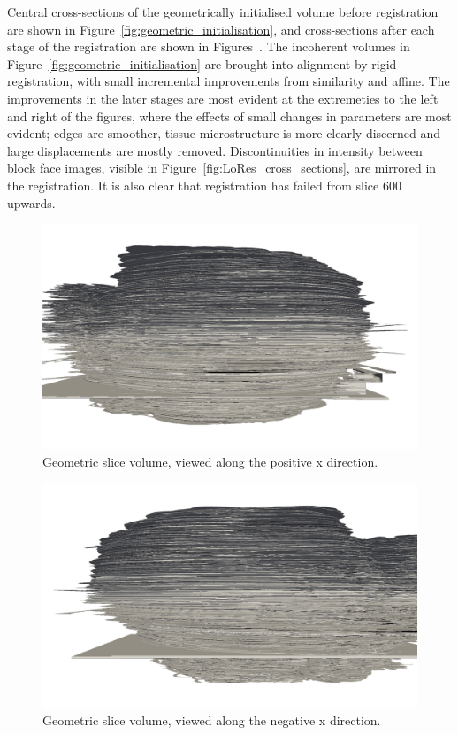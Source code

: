 	Central cross-sections of the geometrically initialised volume before registration are shown in Figure~\ref{fig:geometric_initialisation}, and cross-sections after each stage of the registration are shown in Figures~. The incoherent volumes in Figure~\ref{fig:geometric_initialisation} are brought into alignment by rigid registration, with small incremental improvements from similarity and affine. The improvements in the later stages are most evident at the extremeties to the left and right of the figures, where the effects of small changes in parameters are most evident; edges are smoother, tissue microstructure is more clearly discerned and large displacements are mostly removed. Discontinuities in intensity between block face images, visible in Figure~\ref{fig:LoRes_cross_sections}, are mirrored in the registration. It is also clear that registration has failed from slice 600 upwards.
	
	\begin{figure}
	  \centering
	  \includegraphics[width=0.9\textheight]{Ch6/Figs/Rat28/contours/whole_positive_x_geometric}
	  \caption{Geometric slice volume, viewed along the positive x direction.}
	  \label{fig:positive_x_geometric_contour}
	\end{figure}

	\begin{figure}
	  \centering
	  \includegraphics[width=0.9\textheight]{Ch6/Figs/Rat28/contours/whole_negative_x_geometric}
	  \caption{Geometric slice volume, viewed along the negative x direction.}
	  \label{fig:negative_x_geometric_contour}
	\end{figure}

